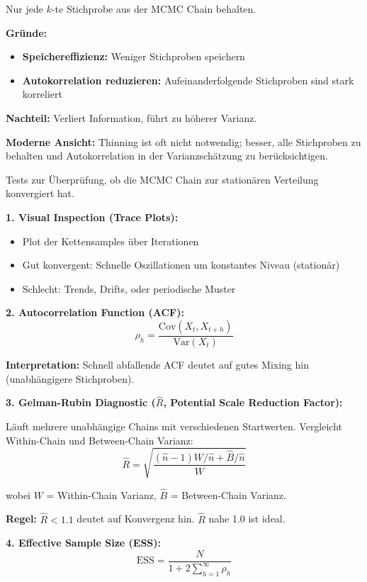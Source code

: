 Nur jede $k$-te Stichprobe aus der MCMC Chain behalten.

\textbf{Gründe:}
\begin{itemize}[leftmargin=1.5em]
    \item \textbf{Speichereffizienz:} Weniger Stichproben speichern
    \item \textbf{Autokorrelation reduzieren:} Aufeinanderfolgende Stichproben sind stark korreliert
\end{itemize}

\textbf{Nachteil:} Verliert Information, führt zu höherer Varianz.

\textbf{Moderne Ansicht:} Thinning ist oft nicht notwendig; besser, alle Stichproben zu behalten und Autokorrelation in der Varianzschätzung zu berücksichtigen.

Tests zur Überprüfung, ob die MCMC Chain zur stationären Verteilung konvergiert hat.

\textbf{1. Visual Inspection (Trace Plots):}
\begin{itemize}[leftmargin=1.5em]
    \item Plot der Kettensamples über Iterationen
    \item Gut konvergent: Schnelle Oszillationen um konstantes Niveau (stationär)
    \item Schlecht: Trends, Drifts, oder periodische Muster
\end{itemize}

\textbf{2. Autocorrelation Function (ACF):}
$$\rho_h = \frac{\text{Cov}(X_t, X_{t+h})}{\text{Var}(X_t)}$$

\textbf{Interpretation:} Schnell abfallende ACF deutet auf gutes Mixing hin (unabhängigere Stichproben).

\textbf{3. Gelman-Rubin Diagnostic ($\hat{R}$, Potential Scale Reduction Factor):}

Läuft mehrere unabhängige Chains mit verschiedenen Startwerten. Vergleicht Within-Chain und Between-Chain Varianz:
$$\hat{R} = \sqrt{\frac{(\hat{n}-1) W/\hat{n} + \hat{B}/\hat{n}}{W}}$$

wobei $W$ = Within-Chain Varianz, $\hat{B}$ = Between-Chain Varianz.

\textbf{Regel:} $\hat{R} < 1.1$ deutet auf Konvergenz hin. $\hat{R}$ nahe 1.0 ist ideal.

\textbf{4. Effective Sample Size (ESS):}
$$\text{ESS} = \frac{N}{1 + 2 \sum_{h=1}^{\infty} \rho_h}$$

